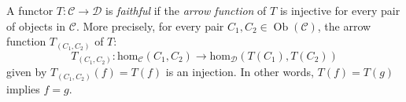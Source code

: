 \documentclass[12pt]{article}
\begin{document}

A functor $T:\mathcal{C}\to\mathcal{D}$ is \emph{faithful} if the \emph{arrow function} of $T$ is injective for every 
pair of objects in $\mathcal{C}$.  More precisely, for every pair $C_1, C_2\in \operatorname{Ob}(\mathcal{C})$, the 
arrow function $T_{(C_1,C_2)}$ of $T:$ 
$$T_{(C_1,C_2)}:\operatorname{hom_{\mathcal{C}}}(C_1,C_2)\to\operatorname{hom_{\mathcal{D}}}(T(C_1),T(C_2))$$
given by $T_{(C_1,C_2)}(f)=T(f)$ is an injection.  In other words, $T(f)=T(g)$ implies $f=g$.
\end{document}
